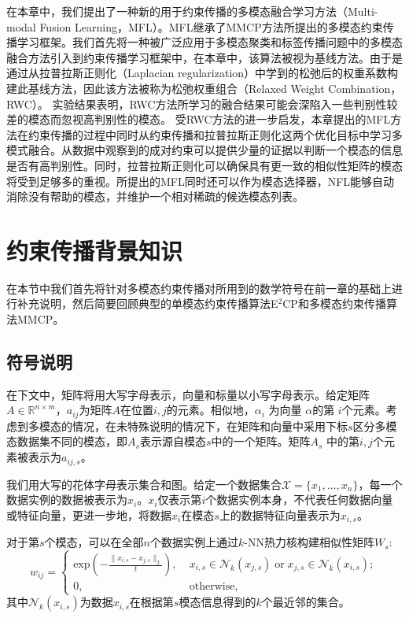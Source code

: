 在本章中，我们提出了一种新的用于约束传播的多模态融合学习方法（Multi-modal Fusion Learning，MFL）。MFL继承了MMCP方法所提出的多模态约束传播学习框架。我们首先将一种被广泛应用于多模态聚类和标签传播问题中的多模态融合方法引入到约束传播学习框架中，在本章中，该算法被视为基线方法。由于是通过从拉普拉斯正则化（Laplacian regularization）中学到的松弛后的权重系数构建此基线方法，因此该方法被称为松弛权重组合（Relaxed Weight Combination，RWC）。
实验结果表明，RWC方法所学习的融合结果可能会深陷入一些判别性较差的模态而忽视高判别性的模态。
受RWC方法的进一步启发，本章提出的MFL方法在约束传播的过程中同时从约束传播和拉普拉斯正则化这两个优化目标中学习多模式融合。从数据中观察到的成对约束可以提供少量的证据以判断一个模态的信息是否有高判别性。同时，拉普拉斯正则化可以确保具有更一致的相似性矩阵的模态将受到足够多的重视。所提出的MFL同时还可以作为模态选择器，NFL能够自动消除没有帮助的模态，并维护一个相对稀疏的候选模态列表。

\section{约束传播背景知识}
在本节中我们首先将针对多模态约束传播对所用到的数学符号在前一章的基础上进行补充说明，然后简要回顾典型的单模态约束传播算法E$^2$CP\cite{lu2010constrained}和多模态约束传播算法MMCP\cite{fu2011multi}。
\subsection{符号说明}
在下文中，矩阵将用大写字母表示，向量和标量以小写字母表示。给定矩阵$ {A} \in \mathbb{R}^{n\times m}$，$ a_{ij} $为矩阵$A$在位置$ i,j $的元素。相似地，$ \alpha_{i} $ 为向量 $ {\alpha} $的第 $ i $个元素。考虑到多模态的情况，在未特殊说明的情况下，在矩阵和向量中采用下标$s$区分多模态数据集不同的模态，即${A}_s$表示源自模态$s$中的一个矩阵。矩阵$ {A}_s $ 中的第$ i,j $个元素被表示为$a_{ij,s}$。

我们用大写的花体字母表示集合和图。给定一个数据集合$\mathcal{X} = \{x_1,\dots,x_n \}$，每一个数据实例的数据被表示为$x_i$。$x_i$仅表示第$i$个数据实例本身，不代表任何数据向量或特征向量，更进一步地，将数据$x_i$在模态$s$上的数据特征向量表示为$x_{i,s}$。

对于第$s$个模态，可以在全部$n$个数据实例上通过$k$-NN热力核构建相似性矩阵$ {W}_s$:
\begin{equation}
w_{ij} = \begin{cases} \mathrm{exp}(-\frac{\|x_{i,s}-x_{j,s}\|_{2}}{t}), \; &x_{i,s}\in\mathcal{N}_k(x_{j,s})\;\mathrm{or}\; x_{j,s}\in\mathcal{N}_k(x_{i,s});\\
0,&\mathrm{otherwise,}\end{cases}   
\label{eq3:GaussKer}                              
\end{equation}
其中$\mathcal{N}_k(x_{i,s})$为数据$x_{i,s}$在根据第$s$模态信息得到的$k$个最近邻的集合。

